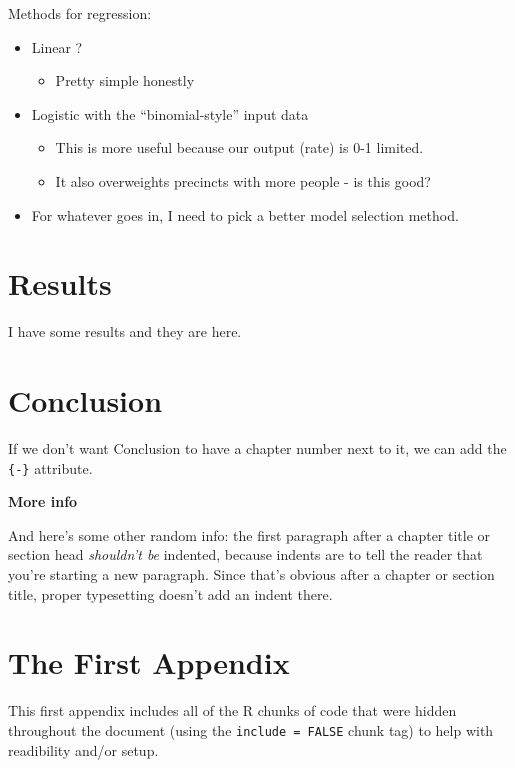 \documentclass[12pt,twoside]{reedthesis}
\providecommand{\tightlist}{%
  \setlength{\itemsep}{0pt}\setlength{\parskip}{0pt}}
\theoremstyle{definition}
\theoremstyle{definition}
\theoremstyle{definition}
\theoremstyle{remark}
\begin{document}
Methods for regression:
\begin{itemize}
\tightlist
\item
  Linear ?
  \begin{itemize}
  \tightlist
  \item
    Pretty simple honestly
  \end{itemize}
\item
  Logistic with the ``binomial-style'' input data
  \begin{itemize}
  \tightlist
  \item
    This is more useful because our output (rate) is 0-1 limited.
  \item
    It also overweights precincts with more people - is this good?
  \end{itemize}
\item
  For whatever goes in, I need to pick a better model selection method.
\end{itemize}
\hypertarget{results}{%
\chapter{Results}\label{results}}

I have some results and they are here.

\hypertarget{conclusion}{%
\chapter*{Conclusion}\label{conclusion}}

If we don't want Conclusion to have a chapter number next to it, we can
add the \texttt{\{-\}} attribute.

\textbf{More info}

And here's some other random info: the first paragraph after a chapter
title or section head \emph{shouldn't be} indented, because indents are
to tell the reader that you're starting a new paragraph. Since that's
obvious after a chapter or section title, proper typesetting doesn't add
an indent there.

\appendix

\hypertarget{the-first-appendix}{%
\chapter{The First Appendix}\label{the-first-appendix}}

This first appendix includes all of the R chunks of code that were
hidden throughout the document (using the \texttt{include\ =\ FALSE}
chunk tag) to help with readibility and/or setup.
\end{document}
